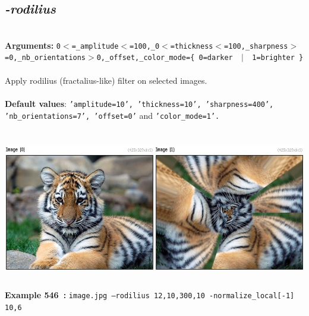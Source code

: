 \documentclass[a4paper,11pt,twoside]{book}
\begin{document}
\subsection{\emph{-rodilius} }\vspace*{-0.5em}
~\\\textbf{Arguments: } 
{\small \texttt{0$<$=\_amplitude$<$=100,\_0$<$=thickness$<$=100,\_sharpness$>$=0,\_nb\_orientations$>$0,\_offset,\_color\_mode=\{ 0=darker ~$|$~ 1=brighter \}}}\\~\\
Apply rodilius (fractalius-like) filter on selected images.
~\\~\\\textbf{Default values}: {\small \texttt{'amplitude=10', 'thickness=10', 'sharpness=400', 'nb\_orientations=7', 'offset=0'} and \texttt{'color\_mode=1'.}}
\begin{center}\includegraphics[keepaspectratio=true,height=7cm,width=\textwidth]{img/gmic_def546.jpg}\\
{\footnotesize \textbf{Example 546~:} \texttt{image.jpg --rodilius 12,10,300,10 -normalize\_local[-1] 10,6}}
\end{center}
\end{document}
